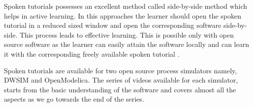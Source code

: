 \documentclass[12pt]{report}
\begin{document}
\begin{itemize}
Spoken tutorials possesses an excellent method called side-by-side method which helps in active learning. In this approaches the learner should open the spoken tutorial in a reduced sized window and open the corresponding software side-by-side. This process leads to effective learning. This is possible only with open source software as the learner can easily attain the software locally and can learn it with the corresponding freely available spoken tutorial \cite{Sidebyside}.

Spoken tutorials are available for two open source process simulators namely, DWSIM\cite{ST1} and OpenModelica\cite{ST2}. The series of videos available for each simulator, starts from the basic understanding of the software and covers almost all the aspects as we go towards the end of the series.  
\end{itemize}
\end{document}

